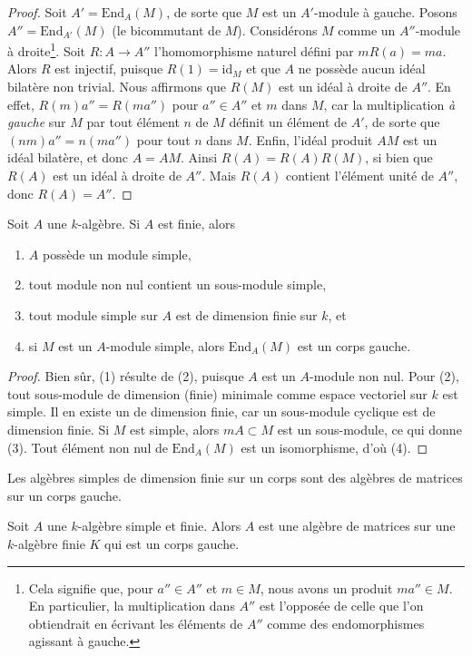 \begin{proof}
Soit $A' = \text{End}_A(M)$, de sorte que $M$ est un $A'$-module à gauche.
Posons $A'' = \text{End}_{A'}(M)$ (le bicommutant de $M$).
Considérons $M$ comme un $A''$-module à droite\footnote{Cela
signifie que, pour $a'' \in A''$ et $m \in M$, nous avons un produit
$m a'' \in M$. En particulier, la multiplication dans $A''$
est l'opposée de celle que l'on obtiendrait en écrivant les éléments de $A''$
comme des endomorphismes agissant à gauche.}.
Soit $R : A \to A''$ l'homomorphisme naturel défini par
$mR(a) = ma$. Alors $R$ est injectif, puisque $R(1) = \text{id}_M$
et que $A$ ne possède aucun idéal bilatère non trivial. Nous affirmons que $R(M)$
est un idéal à droite de $A''$. En effet, $R(m)a'' = R(ma'')$ pour $a'' \in A''$
et $m$ dans $M$, car la multiplication {\it à gauche} sur $M$ par tout élément $n$
de $M$ définit un élément de $A'$, de sorte que
$(nm)a'' = n(ma'')$ pour tout $n$ dans $M$.
Enfin, l'idéal produit $AM$ est un idéal bilatère, et donc
$A = AM$. Ainsi $R(A) = R(A)R(M)$, si bien que $R(A)$ est un idéal à droite de $A''$.
Mais $R(A)$ contient l'élément unité de $A''$, donc $R(A) = A''$.
\end{proof}

\begin{lemma}
\label{lemma-simple-module}
Soit $A$ une $k$-algèbre. Si $A$ est finie, alors
\begin{enumerate}
\item $A$ possède un module simple,
\item tout module non nul contient un sous-module simple,
\item tout module simple sur $A$ est de dimension finie sur $k$, et
\item si $M$ est un $A$-module simple, alors $\text{End}_A(M)$ est un
corps gauche.
\end{enumerate}
\end{lemma}

\begin{proof}
Bien sûr, (1) résulte de (2), puisque $A$ est un $A$-module non nul.
Pour (2), tout sous-module de dimension (finie) minimale comme espace vectoriel sur $k$
est simple. Il en existe un de dimension finie,
car un sous-module cyclique est de dimension finie. Si $M$ est simple, alors
$mA \subset M$ est un sous-module, ce qui donne (3). Tout élément non nul
de $\text{End}_A(M)$ est un isomorphisme, d'où (4).
\end{proof}

\begin{theorem}
\label{theorem-wedderburn}
\begin{slogan}
Les algèbres simples de dimension finie sur un corps sont des algèbres de matrices sur un corps gauche.
\end{slogan}
Soit $A$ une $k$-algèbre simple et finie. Alors $A$ est une algèbre de matrices sur
une $k$-algèbre finie $K$ qui est un corps gauche.
\end{theorem}

